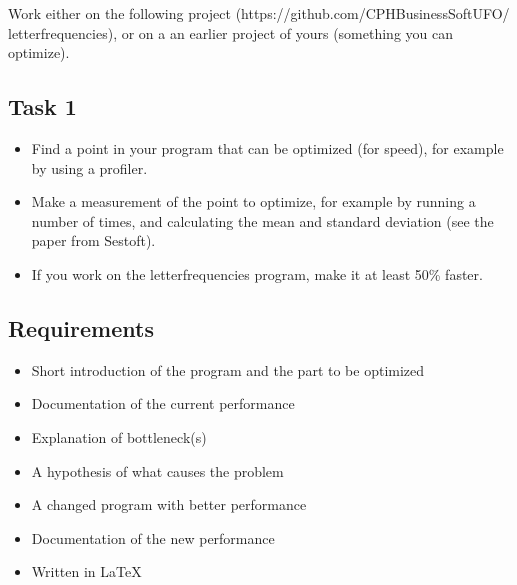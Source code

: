 
Work either on the following project (https://github.com/CPHBusinessSoftUFO/
letterfrequencies), or on a an earlier project of yours (something you can
optimize).
\vspace{0.5cm}
\subsection{Task 1}
\label{sec:1.1}
\begin{itemize}
    \item Find a point in your program that can be optimized (for speed), for example by using a profiler.
    \item Make a measurement of the point to optimize, for example by running a
    number of times, and calculating the mean and standard deviation (see
    the paper from Sestoft).
    \item If you work on the letterfrequencies program, make it at least 50\%
    faster.
\end{itemize}
\vspace{0.5cm}
\subsection{Requirements}
\label{sec:1.2}
\begin{itemize}
    \item Short introduction of the program and the part to be optimized
    \item Documentation of the current performance
    \item Explanation of bottleneck(s)
    \item A hypothesis of what causes the problem
    \item A changed program with better performance
    \item Documentation of the new performance
    \item Written in \LaTeX\ 
\end{itemize}








